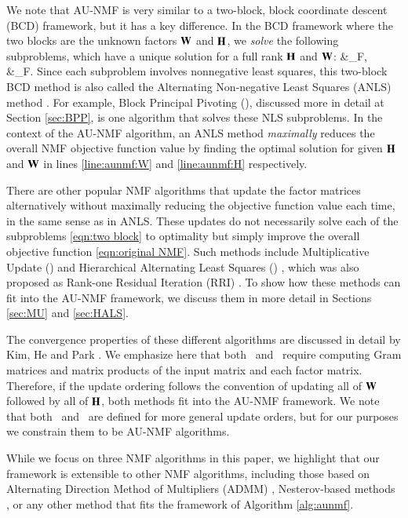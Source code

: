 We note that AU-NMF is very similar to a two-block, block coordinate descent (BCD) framework, but it has a key difference.
In the BCD framework where the two blocks are
the unknown factors $\mathbf{W}$ and $\mathbf{H}$, 
we \emph{solve} the following subproblems,
which have a unique solution for a full rank $\mathbf{H}$ and $\mathbf{W}$: 
\SplitN{\label{eqn:two block}} {
\WW &\leftarrow {}\NormBr{\AA-\tilde\WW\HH}_F,\\
\HH &\leftarrow  {}\NormBr{\AA-\WW\tilde\HH}_F.
}
Since each subproblem involves nonnegative least squares,
this two-block BCD method is also called
the Alternating Non-negative Least Squares (ANLS) method \cite{kim2013nonnegative}.
For example, Block Principal Pivoting (\BPP), discussed more in detail at Section \ref{sec:BPP}, is 
one algorithm that solves these NLS subproblems.
In the context of the AU-NMF algorithm,
 an ANLS method {\em maximally} reduces 
the overall NMF objective function value 
by finding the optimal solution for
 given $\mathbf{H}$ and $\mathbf{W}$ in lines \ref{line:aunmf:W} 
and \ref{line:aunmf:H} respectively.  

There are other popular NMF algorithms 
that update the factor matrices alternatively
without maximally reducing the objective function value each time,
in the same sense as in ANLS. 
These updates do not necessarily solve each of the subproblems \eqref{eqn:two block} to optimality but simply improve the overall objective function \eqref{eqn:original NMF}.  
Such methods include Multiplicative Update (\MU) \cite{seung2001algorithms} and Hierarchical Alternating Least Squares (\HALS) \cite{cichocki2009nonnegative}, which was also proposed as Rank-one Residual Iteration (RRI) \cite{Ho2008}.
To show how these methods can fit into the AU-NMF framework, we discuss them in more detail in Sections \ref{sec:MU} and \ref{sec:HALS}.

The convergence properties of these different algorithms are discussed in detail by Kim, He and Park \cite{kim2013nonnegative}. 
We emphasize here that both \MU\ and \HALS\ require computing Gram matrices and matrix products of the input matrix and each factor matrix.
Therefore, if the update ordering follows the convention of updating all of $\mathbf{W}$ followed by all of $\mathbf{H}$, both methods fit into the AU-NMF framework. 
We note that both \MU\ and \HALS\ are defined for more general update orders, but for our purposes we constrain them to be AU-NMF algorithms.

While we focus on three NMF algorithms in this paper, we highlight that our framework is extensible to other NMF algorithms, including those based on Alternating Direction Method of Multipliers (ADMM) \cite{SF14}, Nesterov-based methods \cite{GTLY12}, or any other method that fits the framework of Algorithm \ref{alg:aunmf}.

